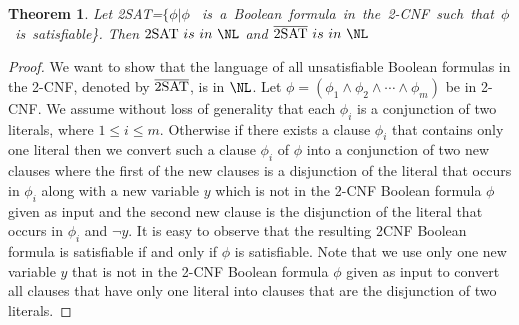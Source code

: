 \documentclass{amsbook}
\newtheorem{theorem}{Theorem}[chapter]
\theoremstyle{definition}
\theoremstyle{remark}
\numberwithin{section}{chapter}
\numberwithin{equation}{chapter}
\begin{document}
\begin{theorem}\label{chap2-2SATisinNL}
Let {\rm 2SAT}=$\{\phi|\phi$ {~is~a~Boolean~formula~in~the~}2-CNF{~such~that~$\phi$ ~is~satisfiable\}}. Then ${\rm 2SAT}~{is~in~\NL}$ and $\overline{\rm 2SAT}~{is~in~\NL}$
\end{theorem}
\begin{proof}
We want to show that the language of all unsatisfiable Boolean formulas in the 2-CNF, denoted by $\overline {\rm 2SAT}$, is in $\NL$. Let $\phi=(\phi _1\wedge\phi _2\wedge\cdots\wedge\phi_m)$ be in 2-CNF. We assume without loss of generality that each $\phi _i$ is a conjunction of two literals, where $1\leq i\leq m$. Otherwise if there exists a clause $\phi _i$ that contains only one literal then we convert such a clause $\phi_i$ of $\phi$ into a conjunction of two new clauses where the first of the new clauses is a disjunction of the literal that occurs in $\phi _i$ along with a new variable $y$ which is not in the 2-CNF Boolean formula $\phi$ given as input and the second new clause is the disjunction of the literal that occurs in $\phi _i$ and $\neg y$. It is easy to observe that the resulting 2CNF Boolean formula is satisfiable if and only if $\phi$ is satisfiable. Note that we use only one new variable $y$ that is not in the 2-CNF Boolean formula $\phi$ given as input to convert all clauses that have only one literal into clauses that are the disjunction of two literals.


\end{proof}
\end{document}
